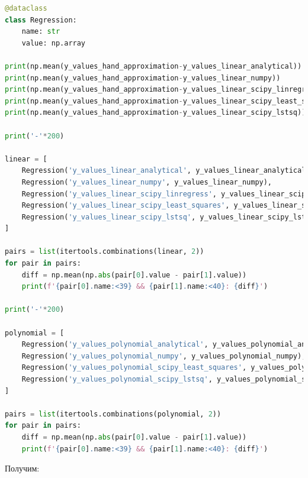 \documentclass[a4paper, 14pt]{extarticle}
\begin{document}
\begin{center}
    \begin{lstlisting}[language=Python]
@dataclass
class Regression:
    name: str
    value: np.array

print(np.mean(y_values_hand_approximation-y_values_linear_analytical))
print(np.mean(y_values_hand_approximation-y_values_linear_numpy))
print(np.mean(y_values_hand_approximation-y_values_linear_scipy_linregress))
print(np.mean(y_values_hand_approximation-y_values_linear_scipy_least_squares))
print(np.mean(y_values_hand_approximation-y_values_linear_scipy_lstsq))

print('-'*200)

linear = [
    Regression('y_values_linear_analytical', y_values_linear_analytical), 
    Regression('y_values_linear_numpy', y_values_linear_numpy),
    Regression('y_values_linear_scipy_linregress', y_values_linear_scipy_linregress),
    Regression('y_values_linear_scipy_least_squares', y_values_linear_scipy_least_squares),
    Regression('y_values_linear_scipy_lstsq', y_values_linear_scipy_lstsq)
]

pairs = list(itertools.combinations(linear, 2))
for pair in pairs:
    diff = np.mean(np.abs(pair[0].value - pair[1].value))
    print(f'{pair[0].name:<39} && {pair[1].name:<40}: {diff}')

print('-'*200)

polynomial = [
    Regression('y_values_polynomial_analytical', y_values_polynomial_analytical), 
    Regression('y_values_polynomial_numpy', y_values_polynomial_numpy),
    Regression('y_values_polynomial_scipy_least_squares', y_values_polynomial_scipy_least_squares),
    Regression('y_values_polynomial_scipy_lstsq', y_values_polynomial_scipy_lstsq)
]

pairs = list(itertools.combinations(polynomial, 2))
for pair in pairs:
    diff = np.mean(np.abs(pair[0].value - pair[1].value))
    print(f'{pair[0].name:<39} && {pair[1].name:<40}: {diff}')
    \end{lstlisting}
\end{center}

\newpage
Получим:
\end{document}
